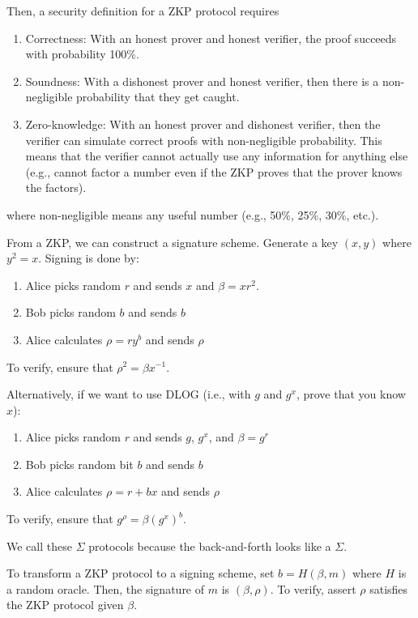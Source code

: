 \documentclass[notes]{agony}
\begin{document}
Then, a security definition for a ZKP protocol requires
\begin{enumerate}[1.]
  \item Correctness: With an honest prover and honest verifier,
        the proof succeeds with probability 100\%.
  \item Soundness: With a dishonest prover and honest verifier,
        then there is a non-negligible probability that they get caught.
  \item Zero-knowledge: With an honest prover and dishonest verifier,
        then the verifier can simulate correct proofs with non-negligible probability.
        This means that the verifier cannot actually use any information
        for anything else (e.g., cannot factor a number even if the ZKP proves
        that the prover knows the factors).
\end{enumerate}
where non-negligible means any useful number (e.g., 50\%, 25\%, 30\%, etc.).

From a ZKP, we can construct a signature scheme. Generate a key $(x, y)$ where $y^2=x$.
Signing is done by:
\begin{enumerate}[1.,nosep]
  \item Alice picks random $r$ and sends $x$ and $\beta = xr^2$.
  \item Bob picks random $b$ and sends $b$
  \item Alice calculates $\rho = ry^b$ and sends $\rho$
\end{enumerate}
To verify, ensure that $\rho^2 = \beta x^{-1}$.

Alternatively, if we want to use DLOG (i.e., with $g$ and $g^x$, prove that you know $x$):
\begin{enumerate}[1.,nosep]
  \item Alice picks random $r$ and sends $g$, $g^x$, and $\beta = g^r$
  \item Bob picks random bit $b$ and sends $b$
  \item Alice calculates $\rho = r + bx$ and sends $\rho$
\end{enumerate}
To verify, ensure that $g^\rho = \beta(g^x)^b$.

We call these $\Sigma$ protocols because the back-and-forth looks like a $\Sigma$.

\begin{defn}
  To transform a ZKP protocol to a signing scheme,
  set $b = H(\beta, m)$ where $H$ is a random oracle.
  Then, the signature of $m$ is $(\beta,\rho)$.
  To verify, assert $\rho$ satisfies the ZKP protocol given $\beta$.
\end{defn}
\end{document}

